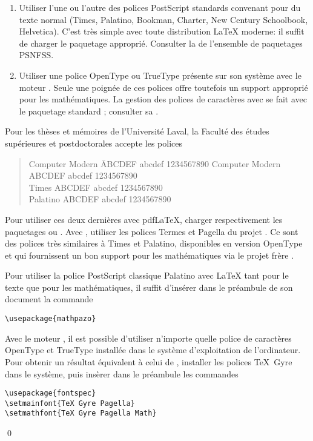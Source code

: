 \begin{enumerate}
\item Utiliser l'une ou l'autre des polices PostScript standards
  convenant pour du texte normal
  ({\Times Times}, %
   {\Palatino Palatino}, %
   {\Bookman Bookman}, %
   {\Charter Charter}, %
   {\NewCent New Century Schoolbook}, %
   {\Helvet Helvetica}). %
  C'est très simple avec toute distribution {\LaTeX} moderne: il
  suffit de charger le paquetage approprié. Consulter la %
  de l'ensemble de paquetages PSNFSS.
\item Utiliser une police OpenType ou TrueType présente sur son
  système avec le moteur {\XeLaTeX}. Seule une poignée de ces polices
  offre toutefois un support approprié pour les mathématiques. La
  gestion des polices de caractères avec {\XeLaTeX} se fait avec le
  paquetage standard ; consulter sa %
  .
\end{enumerate}

Pour les thèses et mémoires de l'Université Laval, la Faculté des
études supérieures et postdoctorales accepte les polices %
\begin{quote}
  \begin{tabbing}
    Computer Modern \qquad \=  ABCDEF abcdef 1234567890 \kill
    {\CM Computer Modern} \> {\CM ABCDEF abcdef 1234567890} \\
    {\Times Times} \> {\Times ABCDEF abcdef 1234567890} \\
    {\Palatino Palatino} \> {\Palatino ABCDEF abcdef 1234567890}
  \end{tabbing}
\end{quote}
Pour utiliser ces deux dernières avec pdf{\LaTeX}, charger
respectivement les paquetages  ou . Avec
{\XeLaTeX}, utiliser les polices Termes et Pagella du projet %
.
Ce sont des polices très similaires à Times et Palatino, disponibles
en version OpenType et qui fournissent un bon support pour les
mathématiques via le projet frère %
.

\begin{exemple}
  \label{ex:trucs:palatino}
  Pour utiliser la police PostScript classique Palatino avec {\LaTeX}
  tant pour le texte que pour les mathématiques, il suffit d'insérer
  dans le préambule de son document la commande
\begin{lstlisting}
\usepackage{mathpazo}
\end{lstlisting}

  Avec le moteur {\XeLaTeX}, il est possible d'utiliser n'importe
  quelle police de caractères OpenType et TrueType installée dans le
  système d'exploitation de l'ordinateur. Pour obtenir un résultat
  équivalent à celui de , installer les polices TeX~Gyre
  dans le système, puis insèrer dans le préambule les commandes
\begin{lstlisting}
\usepackage{fontspec}
\setmainfont{TeX Gyre Pagella}
\setmathfont{TeX Gyre Pagella Math}
\end{lstlisting}
  \qed
\end{exemple}

